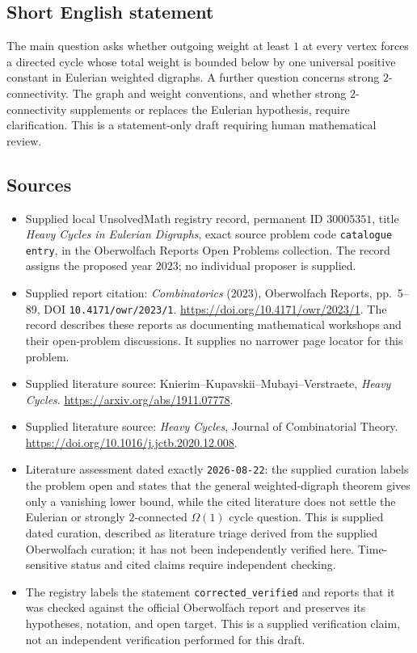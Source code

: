 \documentclass[11pt]{article}
\begin{document}
\subsection{Short English statement}
The main question asks whether outgoing weight at least \(1\) at every vertex forces a directed cycle whose total weight is bounded below by one universal positive constant in Eulerian weighted digraphs. A further question concerns strong \(2\)-connectivity. The graph and weight conventions, and whether strong \(2\)-connectivity supplements or replaces the Eulerian hypothesis, require clarification. This is a statement-only draft requiring human mathematical review.
\subsection{Sources}
\begin{itemize}
\item Supplied local UnsolvedMath registry record, permanent ID \(30005351\), title \emph{Heavy Cycles in Eulerian Digraphs}, exact source problem code \texttt{catalogue entry}, in the Oberwolfach Reports Open Problems collection. The record assigns the proposed year \(2023\); no individual proposer is supplied.
\item Supplied report citation: \emph{Combinatorics} (2023), Oberwolfach Reports, pp.~5--89, DOI \texttt{10.4171/owr/2023/1}. \url{https://doi.org/10.4171/owr/2023/1}. The record describes these reports as documenting mathematical workshops and their open-problem discussions. It supplies no narrower page locator for this problem.
\item Supplied literature source: Knierim--Kupavskii--Mubayi--Verstraete, \emph{Heavy Cycles}. \url{https://arxiv.org/abs/1911.07778}.
\item Supplied literature source: \emph{Heavy Cycles}, Journal of Combinatorial Theory. \url{https://doi.org/10.1016/j.jctb.2020.12.008}.
\item Literature assessment dated exactly \texttt{2026-08-22}: the supplied curation labels the problem open and states that the general weighted-digraph theorem gives only a vanishing lower bound, while the cited literature does not settle the Eulerian or strongly \(2\)-connected \(\Omega(1)\) cycle question. This is supplied dated curation, described as literature triage derived from the supplied Oberwolfach curation; it has not been independently verified here. Time-sensitive status and cited claims require independent checking.
\item The registry labels the statement \texttt{corrected\_verified} and reports that it was checked against the official Oberwolfach report and preserves its hypotheses, notation, and open target. This is a supplied verification claim, not an independent verification performed for this draft.
\end{itemize}
\end{document}
